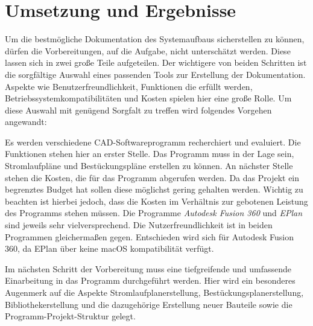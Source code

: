\chapter{Umsetzung und Ergebnisse}
\label{cha:umsetzung}
Um die bestmögliche Dokumentation des Systemaufbaus sicherstellen zu können, dürfen die Vorbereitungen, auf die Aufgabe, nicht unterschätzt werden. Diese lassen sich in zwei große Teile aufgeteilen. Der wichtigere von beiden Schritten ist die sorgfältige Auswahl eines passenden Tools zur Erstellung der Dokumentation. Aspekte wie Benutzerfreundlichkeit, Funktionen die erfüllt werden, Betriebssystemkompatibilitäten und Kosten spielen hier eine große Rolle. Um diese Auswahl mit genügend Sorgfalt zu treffen wird folgendes Vorgehen angewandt:

Es werden verschiedene CAD-Softwareprogramm recherchiert und evaluiert. Die Funktionen stehen hier an erster Stelle. Das Programm muss in der Lage sein, Stromlaufpläne und Bestückungspläne erstellen zu können. An nächster Stelle stehen die Kosten, die für das Programm abgerufen werden. Da das Projekt ein begrenztes Budget hat sollen diese möglichst gering gehalten werden. Wichtig zu beachten ist hierbei jedoch, dass die Kosten im Verhältnis zur gebotenen Leistung des Programms stehen müssen. Die Programme \textit{Autodesk Fusion 360} und \textit{EPlan} sind jeweils sehr vielversprechend. Die Nutzerfreundlichkeit ist in beiden Programmen gleichermaßen gegen. Entschieden wird sich für Autodesk Fusion 360, da EPlan über keine macOS kompatibilität verfügt.

Im nächsten Schritt der Vorbereitung muss eine tiefgreifende und umfassende Einarbeitung in das Programm durchgeführt werden. Hier wird ein besonderes Augenmerk auf die Aspekte Stromlaufplanerstellung, Bestückungsplanerstellung, Bibliothekerstellung und die dazugehörige Erstellung neuer Bauteile sowie die Programm-Projekt-Struktur gelegt.



%

%

%

